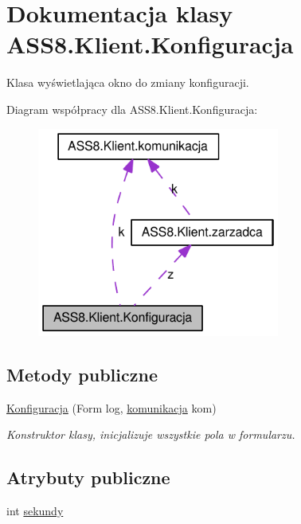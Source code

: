 \hypertarget{a00014}{
\section{Dokumentacja klasy ASS8.Klient.Konfiguracja}
\label{d2/de7/a00014}
}
Klasa wyświetlająca okno do zmiany konfiguracji.  


Diagram współpracy dla ASS8.Klient.Konfiguracja:\nopagebreak
\begin{figure}[H]
\begin{center}
\leavevmode
\includegraphics[width=226pt]{d1/db7/a00157}
\end{center}
\end{figure}
\subsection*{Metody publiczne}
\begin{CompactItemize}
\item 
\hyperlink{a00014_b298e3bc6d95ff4bb409a69a84598ea6}{Konfiguracja} (Form log, \hyperlink{a00013}{komunikacja} kom)
\begin{CompactList}\small\item\em Konstruktor klasy, inicjalizuje wszystkie pola w formularzu. \item\end{CompactList}\end{CompactItemize}
\subsection*{Atrybuty publiczne}
\begin{CompactItemize}
\item 
int \hyperlink{a00014_b484254239ce03aa12ad870b9c5454fb}{sekundy}
\end{CompactItemize}
